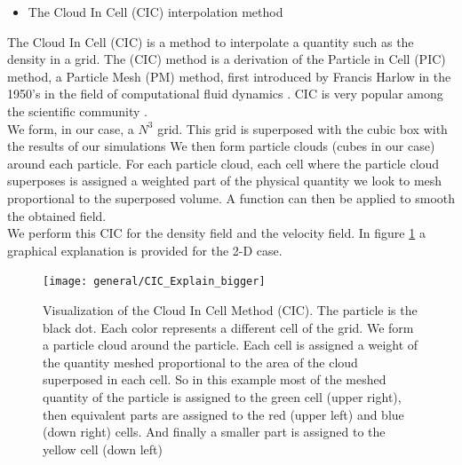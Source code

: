 \documentclass[12pt]{article}
\begin{document}
\begin{itemize}
\item The Cloud In Cell (CIC) interpolation method
\end{itemize}
\begin{par}
The Cloud In Cell (CIC) is a method to interpolate a
 quantity such as the density in a grid. The (CIC) method
 is a derivation of the
 Particle in Cell (PIC) method, a Particle Mesh (PM)
  method, first introduced by Francis Harlow in the
   1950's in the field of computational fluid dynamics
    \cite{harlow1964particle}. CIC is very popular
     among the scientific community
      \cite{grigoryev_numerical_2002}. \\

We form, in our case, a $N^3$ grid. This grid is superposed
 with the cubic box with the results of our simulations
  We then form particle clouds (cubes in our case) around
   each particle. For each particle cloud, each cell 
    where the particle cloud superposes is
    assigned a weighted part of the physical
    quantity we look to mesh proportional to the
    superposed volume. A function can then be applied to
     smooth the obtained field. \\
     
We perform this CIC
            for the density field and the velocity
             field. In figure \ref{fg:cic_explain} a
              graphical explanation is provided for the
               2-D case.  \\
\end{par}

\begin{figure}[ht]
\begin{center}
\texttt{[image: general/CIC\_Explain\_bigger]} %
\caption{Visualization of the Cloud In Cell Method (CIC). The
 particle is the black dot. Each color represents a different
  cell of the grid. We form a particle cloud around the
   particle. Each cell is assigned a weight of the quantity
    meshed proportional to the area of the cloud superposed
     in each cell. So in this example most of the meshed
      quantity of the particle is assigned to the green cell
       (upper right), then equivalent parts are assigned to
        the red (upper left) and blue (down right) cells. And
         finally a smaller part is assigned to the yellow
          cell (down left)}
\label{fg:cic_explain}
\end{center}
\end{figure}
\FloatBarrier
\end{document}
